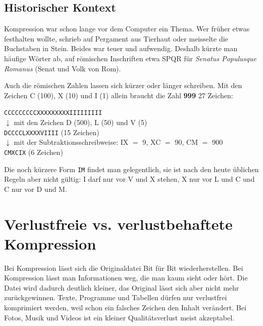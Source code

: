 \subsection{Historischer Kontext}
Kompression war schon lange vor dem Computer ein Thema. Wer früher etwas festhalten wollte, schrieb auf Pergament aus Tierhaut oder meisselte die Buchstaben in Stein. Beides war teuer und aufwendig. Deshalb kürzte man häufige Wörter ab, auf römischen Inschriften etwa SPQR für \textit{Senatus Populusque Romanus} (Senat und Volk von Rom).

Auch die römischen Zahlen lassen sich kürzer oder länger schreiben. Mit den Zeichen C (100), X (10) und I (1) allein braucht die Zahl \textbf{999} 27 Zeichen:
\begin{center}
	\texttt{CCCCCCCCCXXXXXXXXXIIIIIIIII}\\
	$\downarrow$ mit den Zeichen D (500), L (50) und V (5)\\
	\texttt{DCCCCLXXXXVIIII} (15 Zeichen)\\
	$\downarrow$ mit der Subtraktionsschreibweise: IX $=$ 9, XC $=$ 90, CM $=$ 900\\
	\texttt{CMXCIX} (6 Zeichen)
\end{center}
Die noch kürzere Form \texttt{IM} findet man gelegentlich, sie ist nach den heute üblichen Regeln aber nicht gültig: I darf nur vor V und X stehen, X nur vor L und C und C nur vor D und M.

\section{Verlustfreie vs. verlustbehaftete Kompression}
Bei  Kompression lässt sich die Originaldatei Bit für Bit wiederherstellen. Bei  Kompression lässt man Informationen weg, die man kaum sieht oder hört. Die Datei wird dadurch deutlich kleiner, das Original lässt sich aber nicht mehr zurückgewinnen. Texte, Programme und Tabellen dürfen nur verlustfrei komprimiert werden, weil schon ein falsches Zeichen den Inhalt verändert. Bei Fotos, Musik und Videos ist ein kleiner Qualitätsverlust meist akzeptabel.

